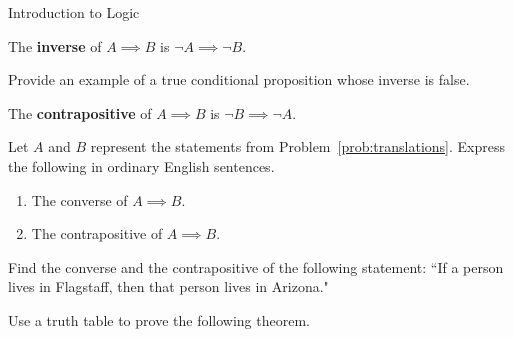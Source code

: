 \begin{section}{Introduction to Logic}
\begin{definition}\label{def:inverse}
The \textbf{inverse} of $A \implies B$ is $\neg A \implies \neg B$.
\end{definition}

\begin{problem}
Provide an example of a true conditional proposition whose inverse is false.
\end{problem}

\begin{definition}
The \textbf{contrapositive} of $A \implies B$ is $\neg B \implies \neg A$.
\end{definition}

\begin{problem}
Let $A$ and $B$ represent the statements from Problem~\ref{prob:translations}.  Express the following in ordinary English sentences.
\begin{enumerate}[label=\textrm{(\alph*)}]
\item The converse of $A \implies B$.
\item The contrapositive of $A \implies B$.
\end{enumerate}
\end{problem}

\begin{problem}
Find the converse and the contrapositive of the following statement: ``If a person lives in Flagstaff, then that person lives in Arizona."
\end{problem}


Use a truth table to prove the following theorem.


\end{section}
